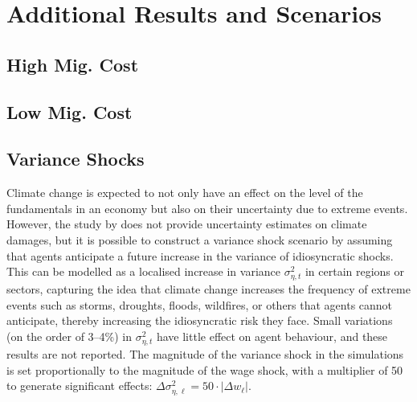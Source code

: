\documentclass[12pt, a4paper]{article}
\begin{document}
\section{Additional Results and Scenarios}
\label{app:additional}
\subsection{High Mig. Cost}









\subsection{Low Mig. Cost}









\subsection{Variance Shocks}

Climate change is expected to not only have an effect on the level of the fundamentals in an economy but also on their uncertainty due to extreme events. However, the study by \citet{hsiang_estimating_2017} does not provide uncertainty estimates on climate damages, but it is possible to construct a variance shock scenario by assuming that agents anticipate a future increase in the variance of idiosyncratic shocks. This can be modelled as a localised increase in variance $\sigma^2_{\eta, t}$ in certain regions or sectors, capturing the idea that climate change increases the frequency of extreme events such as storms, droughts, floods, wildfires, or others that agents cannot anticipate, thereby increasing the idiosyncratic risk they face. Small variations (on the order of 3–4\%) in $\sigma^2_{\eta, t}$ have little effect on agent behaviour, and these results are not reported. The magnitude of the variance shock in the simulations is set proportionally to the magnitude of the wage shock, with a multiplier of 50 to generate significant effects: $\Delta \sigma^2_{\eta, \ell} = 50 \cdot |\Delta w_\ell|$.
\end{document}
